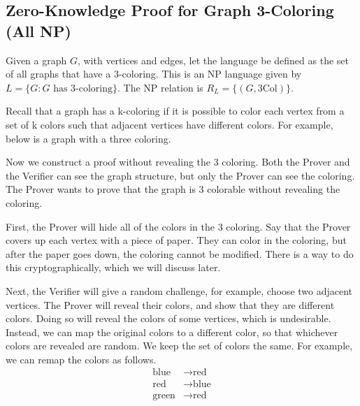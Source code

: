 \subsection{Zero-Knowledge Proof for Graph 3-Coloring (All NP)}

Given a graph $G$, with vertices and edges, let the language be defined as the set of all graphs that have a 3-coloring. This is an NP language given by $L = \{ G: G \text{ has 3-coloring}\}$. The NP relation is $R_L = \{ (G, \text{3Col})\}$. 

Recall that a graph has a k-coloring if it is possible to color each vertex from a set of k colors such that adjacent vertices have different colors. For example, below is a graph with a three coloring.

\begin{center}
\end{center}

Now we construct a proof without revealing the 3 coloring. Both the Prover and the Verifier can see the graph structure, but only the Prover can see the coloring. The Prover wants to prove that the graph is 3 colorable without revealing the coloring.

First, the Prover will hide all of the colors in the 3 coloring. Say that the Prover covers up each vertex with a piece of paper. They can color in the coloring, but after the paper goes down, the coloring cannot be modified. There is a way to do this cryptographically, which we will discuss later.

Next, the Verifier will give a random challenge, for example, choose two adjacent vertices. The Prover will reveal their colors, and show that they are different colors. Doing so will reveal the colors of some vertices, which is undesirable. Instead, we can map the original colors to a different color, so that whichever colors are revealed are random. We keep the set of colors the same. For example, we can remap the colors as follows.
\begin{align*}
    \text{blue} &\to \text{red}\\
    \text{red} &\to \text{blue}\\
    \text{green} &\to \text{red}
\end{align*}

